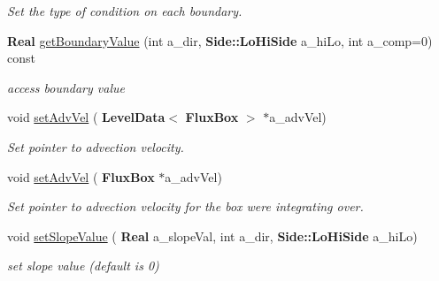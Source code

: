 \begin{DoxyCompactItemize}
\begin{DoxyCompactList}\small\item\em Set the type of condition on each boundary. \end{DoxyCompactList}\item 
\mbox{\label{class_advect_i_b_c_aaa5ac601be5f5f4238dd0b037a85e1dc}} 
\textbf{ Real} \hyperlink{class_advect_i_b_c_aaa5ac601be5f5f4238dd0b037a85e1dc}{get\+Boundary\+Value} (int a\+\_\+dir, \textbf{ Side\+::\+Lo\+Hi\+Side} a\+\_\+hi\+Lo, int a\+\_\+comp=0) const
\begin{DoxyCompactList}\small\item\em access boundary value \end{DoxyCompactList}\item 
\mbox{\label{class_advect_i_b_c_a28147c7f8464b4f5ce98813a277799ad}} 
void \hyperlink{class_advect_i_b_c_a28147c7f8464b4f5ce98813a277799ad}{set\+Adv\+Vel} (\textbf{ Level\+Data}$<$ \textbf{ Flux\+Box} $>$ $\ast$a\+\_\+adv\+Vel)
\begin{DoxyCompactList}\small\item\em Set pointer to advection velocity. \end{DoxyCompactList}\item 
\mbox{\label{class_advect_i_b_c_aae3c93645117a85f8ed4efbc758d9cc6}} 
void \hyperlink{class_advect_i_b_c_aae3c93645117a85f8ed4efbc758d9cc6}{set\+Adv\+Vel} (\textbf{ Flux\+Box} $\ast$a\+\_\+adv\+Vel)
\begin{DoxyCompactList}\small\item\em Set pointer to advection velocity for the box we\textquotesingle{}re integrating over. \end{DoxyCompactList}\item 
\mbox{\label{class_advect_i_b_c_a142042663359db469a777366ca287855}} 
void \hyperlink{class_advect_i_b_c_a142042663359db469a777366ca287855}{set\+Slope\+Value} (\textbf{ Real} a\+\_\+slope\+Val, int a\+\_\+dir, \textbf{ Side\+::\+Lo\+Hi\+Side} a\+\_\+hi\+Lo)
\begin{DoxyCompactList}\small\item\em set slope value (default is 0) \end{DoxyCompactList}\item 
\mbox{\label{class_advect_i_b_c_a9a468f14c7b56b839c212067ca031ca3}} 

\end{DoxyCompactItemize}
